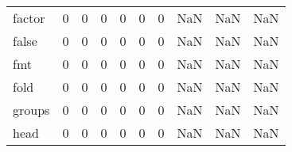 \begin{tabular}{lrrrrrrrrr}
factor    &                                                  0 &                                                  0 &                                                  0 &                                                  0 &                                                  0 &                                                  0 &                                                NaN &                                    NaN &                                  NaN \\
false     &                                                  0 &                                                  0 &                                                  0 &                                                  0 &                                                  0 &                                                  0 &                                                NaN &                                    NaN &                                  NaN \\
fmt       &                                                  0 &                                                  0 &                                                  0 &                                                  0 &                                                  0 &                                                  0 &                                                NaN &                                    NaN &                                  NaN \\
fold      &                                                  0 &                                                  0 &                                                  0 &                                                  0 &                                                  0 &                                                  0 &                                                NaN &                                    NaN &                                  NaN \\
groups    &                                                  0 &                                                  0 &                                                  0 &                                                  0 &                                                  0 &                                                  0 &                                                NaN &                                    NaN &                                  NaN \\
head      &                                                  0 &                                                  0 &                                                  0 &                                                  0 &                                                  0 &                                                  0 &                                                NaN &                                    NaN &                                  NaN \\

\end{tabular}
